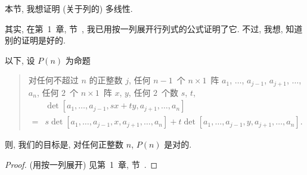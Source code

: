 \documentclass[../libro.tex]{subfiles}
\begin{document}
本节, 我想证明 (关于列的) 多线性.

其实, 在第~1~章, 节~,
我已用按一列展开行列式的公式证明了它.
不过, 我想, 知道别的证明是好的.

以下, 设 \(P(n)\) 为命题
\begin{quotation}
    对任何不超过 \(n\) 的正整数 \(j\),
    任何 \(n-1\)~个 \(n \times 1\)~阵
    \(a_1\), \(\dots\), \(a_{j-1}\),
    \(a_{j+1}\), \(\dots\), \(a_n\),
    任何 \(2\)~个 \(n \times 1\)~阵 \(x\), \(y\),
    任何 \(2\)~个数 \(s\), \(t\),
    \begin{align*}
        & \det
        {[a_1, \dots, a_{j-1}, sx + ty, a_{j+1}, \dots, a_n]}
        \\
        = {} &
        s \det {[a_1, \dots, a_{j-1}, x, a_{j+1}, \dots, a_n]}
        + t \det {[a_1, \dots, a_{j-1}, y, a_{j+1}, \dots, a_n]}.
    \end{align*}
\end{quotation}
则, 我们的目标是,
对任何正整数 \(n\), \(P(n)\) 是对的.

\begin{proof}
    (用按一列展开)
    见第~1~章, 节~.
\end{proof}
\end{document}
